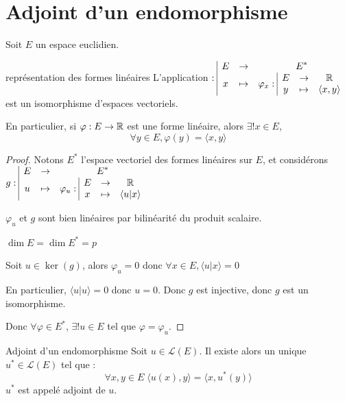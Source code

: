\section{Adjoint d'un endomorphisme}

Soit $E$ un espace euclidien. 

\begin{theoreme}{représentation des formes linéaires}{}
    L'application $: \space \begin{array}{|ccc} \displaystyle E & \to & \displaystyle E^* \\ \displaystyle x & \mapsto & \displaystyle \varphi_x: \space \begin{array}{|ccc} \displaystyle E & \to & \displaystyle \mathbb{R} \\ \displaystyle y & \mapsto & \displaystyle \langle x, y \rangle \end{array} \end{array}$ est un isomorphisme 
    d'espaces vectoriels. 

    En particulier, si $\varphi : E \to \mathbb{R}$ est une forme linéaire, alors $\exists ! x \in E$, 
    $$\forall y \in E, \varphi(y) = \langle x, y \rangle$$
\end{theoreme}


\begin{proof}
    Notons $E^*$ l'espace vectoriel des formes linéaires sur $E$, et considérons 
    $g: \space \begin{array}{|ccc} \displaystyle E & \to & \displaystyle E^* \\ \displaystyle u & \mapsto & \displaystyle \varphi_u: \space \begin{array}{|ccc} \displaystyle E & \to & \displaystyle \mathbb{R} \\ \displaystyle x & \mapsto & \displaystyle \langle u | x \rangle \end{array} \end{array}$

    $\varphi_u$ et $g$ sont bien linéaires par bilinéarité du produit scalaire.

    $\dim E= \dim E^* = p$

    Soit $u \in \ker(g)$, alors $\varphi_u = 0$ donc $\forall x \in E, \langle u | x \rangle = 0$

    En particulier, $\langle u | u \rangle = 0$ donc $u = 0$. Donc $g$ est injective, donc $g$ est un isomorphisme.

    Donc $\forall \varphi \in E^*$, $\exists ! u \in E$ tel que $\varphi = \varphi_u$. 
\end{proof}

\begin{definition}{Adjoint d'un endomorphisme}{}
    Soit $u \in \mathscr L(E)$. Il existe alors un unique $u^* \in \mathscr L(E)$ tel que :
    $$\forall x, y \in E \; \langle u(x), y \rangle = \langle x, u^* (y) \rangle$$
    $u^*$ est appelé adjoint de $u$.
\end{definition}


